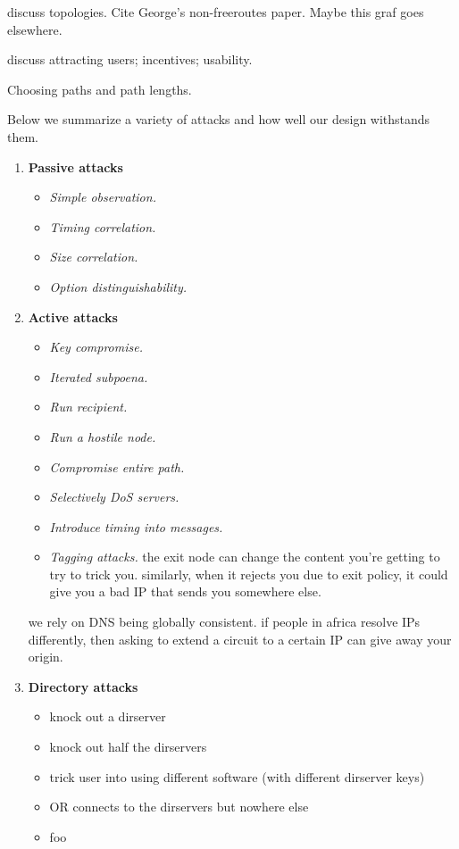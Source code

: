 \documentclass[times,10pt,twocolumn]{article}
\begin{document}
discuss topologies. Cite George's non-freeroutes paper.  Maybe this
graf goes elsewhere.

discuss attracting users; incentives; usability.

Choosing paths and path lengths.


\label{sec:attacks}

Below we summarize a variety of attacks and how well our design withstands
them.

\begin{enumerate}
\item \textbf{Passive attacks}
\begin{itemize}
\item \emph{Simple observation.}
\item \emph{Timing correlation.}
\item \emph{Size correlation.}
\item \emph{Option distinguishability.}
\end{itemize}

\item \textbf{Active attacks}
\begin{itemize}
\item \emph{Key compromise.}
\item \emph{Iterated subpoena.}
\item \emph{Run recipient.}
\item \emph{Run a hostile node.}
\item \emph{Compromise entire path.}
\item \emph{Selectively DoS servers.}
\item \emph{Introduce timing into messages.}
\item \emph{Tagging attacks.}
the exit node can change the content you're getting to try to
trick you. similarly, when it rejects you due to exit policy,
it could give you a bad IP that sends you somewhere else.
\end{itemize}

we rely on DNS being globally consistent. if people in africa resolve
IPs differently, then asking to extend a circuit to a certain IP can
give away your origin.

\item \textbf{Directory attacks}
\begin{itemize}
\item knock out a dirserver
\item knock out half the dirservers
\item trick user into using different software (with different dirserver
keys)
\item OR connects to the dirservers but nowhere else
\item foo
\end{itemize}


\end{enumerate}
\end{document}
